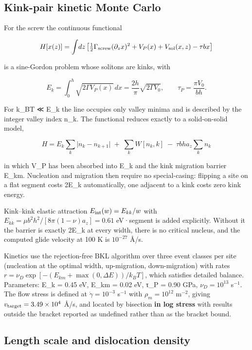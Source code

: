 \hypertarget{kink-pair-kinetic-monte-carlo}{%
\subsection{Kink-pair kinetic Monte Carlo}\label{sec:kink-pair-kinetic-monte-carlo}}

For the screw the continuous functional

\[H[x(z)] = \int\!dz\left[\tfrac12\Gamma_{\rm screw}(\partial_z x)^2 + V_P(x) + V_{\rm sol}(x,z) - \tau b x\right]\]

is a sine-Gordon problem whose solitons are kinks, with

\[E_k = \int_0^h\!\sqrt{2\Gamma V_P(x)}\,dx = \frac{2h}{\pi}\sqrt{2\Gamma V_0},\qquad \tau_P = \frac{\pi V_0}{bh}.\]

For k\_BT ≪ E\_k the line occupies only valley minima and is described by the integer valley index n\_k. The functional reduces exactly to a solid-on-solid model,

\[\boxed{\;H = E_k\sum_k\bigl|n_k - n_{k+1}\bigr| \;+\; \sum_k W[n_k,k] \;-\; \tau b h a_z\sum_k n_k\;}\]

in which V\_P has been absorbed into E\_k and the kink migration barrier E\_km. Nucleation and migration then require no special-casing: flipping a site on a flat segment costs 2E\_k automatically, one adjacent to a kink costs zero kink energy.

Kink--kink elastic attraction \(E_{\rm int}(w) = E_{kk}/w\) with \(E_{kk} = \mu b^2h^2/[8\pi(1-\nu)a_z] = 0.61\) eV·segment is added explicitly. Without it the barrier is exactly 2E\_k at every width, there is no critical nucleus, and the computed glide velocity at 100 K is \(10^{-27}\) \AA/s.

Kinetics use the rejection-free BKL algorithm \cite{bortz1975} over three event classes per site (nucleation at the optimal width, up-migration, down-migration) with rates \(r = \nu_D\exp[-(E_{km} + \max(0,\Delta E))/k_BT]\), which satisfies detailed balance. Parameters: E\_k = 0.45 eV, E\_km = 0.02 eV, τ\_P = 0.90 GPa, \(\nu_D = 10^{13}\) s\(^{-1}\). The flow stress is defined at \(\dot\gamma = 10^{-3}\) s\(^{-1}\) with \(\rho_m = 10^{12}\) m\(^{-2}\), giving \(v_{\rm target} = 3.49\times10^4\) \AA/s, and located by bisection \textbf{in log stress} with results outside the bracket reported as undefined rather than as the bracket bound.

\hypertarget{length-scale-and-dislocation-density}{%
\subsection{Length scale and dislocation density}\label{sec:length-scale-and-dislocation-density}}

